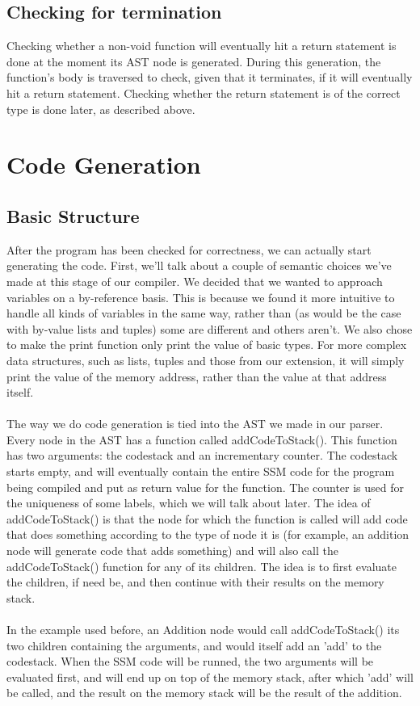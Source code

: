 \documentclass[10pt,a4paper]{article}
\begin{document}
\subsection{Checking for termination}
Checking whether a non-void function will eventually hit a return statement is done at the moment its AST node is generated. During this generation, the function's body is traversed to check, given that it terminates, if it will eventually hit a return statement. Checking whether the return statement is of the correct type is done later, as described above.



\section{Code Generation}
\subsection{Basic Structure} 
After the program has been checked for correctness, we can actually start generating the code. First, we'll talk about a couple of semantic choices we've made at this stage of our compiler. We decided that we wanted to approach variables on a by-reference basis. This is because we found it more intuitive to handle all kinds of variables in the same way, rather than (as would be the case with by-value lists and tuples) some are different and others aren't. We also chose to make the print function only print the value of basic types. For more complex data structures, such as lists, tuples and those from our extension, it will simply print the value of the memory address, rather than the value at that address itself.\\
\\
The way we do code generation is tied into the AST we made in our parser. Every node in the AST has a function called addCodeToStack(). This function has two arguments: the codestack and an incrementary counter. The codestack starts empty, and will eventually contain the entire SSM code for the program being compiled and put as return value for the function. The counter is used for the uniqueness of some labels, which we will talk about later. The idea of addCodeToStack() is that the node for which the function is called will add code that does something according to the type of node it is (for example, an addition node will generate code that adds something) and will also call the addCodeToStack() function for any of its children. The idea is to first evaluate the children, if need be, and then continue with their results on the memory stack. \\
\\
In the example used before, an Addition node would call addCodeToStack() its two children containing the arguments, and would itself add an 'add' to the codestack. When the SSM code will be runned, the two arguments will be evaluated first, and will end up on top of the memory stack, after which 'add' will be called, and the result on the memory stack will be the result of the addition.
\end{document}
